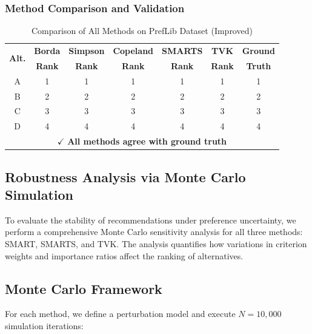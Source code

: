 \documentclass[conference]{IEEEtran}
\begin{document}
\subsubsection{Method Comparison and Validation}

\begin{table}[H]
	\centering
	\caption{Comparison of All Methods on PrefLib Dataset (Improved)}
	\label{tab:preflib_comparison_improved}
	\footnotesize
	\begin{tabular}{|c|c|c|c|c|c|c|}
		\hline
		\multirow{2}{*}{\textbf{Alt.}} & \textbf{Borda} & \textbf{Simpson} & \textbf{Copeland} & \textbf{SMARTS} & \textbf{TVK} & \textbf{Ground} \\
		& \textbf{Rank} & \textbf{Rank} & \textbf{Rank} & \textbf{Rank} & \textbf{Rank} & \textbf{Truth} \\
		\hline
		A & 1 & 1 & 1 & 1 & 1 & 1 \\
		B & 2 & 2 & 2 & 2 & 2 & 2 \\
		C & 3 & 3 & 3 & 3 & 3 & 3 \\
		D & 4 & 4 & 4 & 4 & 4 & 4 \\
		\hline
		\multicolumn{7}{c}{$\checkmark$ \textbf{All methods agree with ground truth}} \\
		\hline
	\end{tabular}
\end{table}
\subsection{Robustness Analysis via Monte Carlo Simulation}

To evaluate the stability of recommendations under preference uncertainty, we perform a comprehensive Monte Carlo sensitivity analysis for all three methods: SMART, SMARTS, and TVK. The analysis quantifies how variations in criterion weights and importance ratios affect the ranking of alternatives.

\subsection{Monte Carlo Framework}

For each method, we define a perturbation model and execute $N = 10,000$ simulation iterations:
\end{document}
